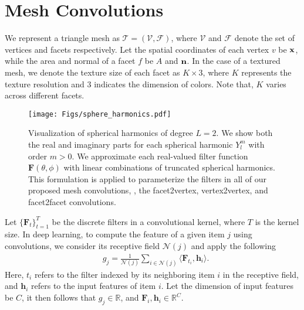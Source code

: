 {\color{black}
\section{Mesh Convolutions}
\vspace{2mm}
We represent a triangle mesh as $\mathcal{T}=(\mathcal{V},\mathcal{F})$, where $\mathcal{V}$ and $\mathcal{F}$ denote the set of vertices and facets respectively. 
Let the spatial coordinates of each vertex $v$ be ${\bf x}$, while the area and normal of a facet $f$ be $A$ and ${\bf n}$.
In the case of a textured mesh, we denote the texture size of each facet as $K \times 3$, where $K$ represents the texture resolution and 3 indicates the dimension of colors. Note that, $K$ varies across different facets.
\begin{figure*}[!t]
    \centering
\texttt{[image: Figs/sphere\_harmonics.pdf]}
    \vspace{-3mm}
    \caption{\color{black}Visualization of spherical harmonics of degree $L=2$. We show both the real and imaginary parts for each spherical harmonic $Y_l^m$ with order $m>0$. We approximate each real-valued filter function ${\mathbf F}(\theta,\phi)$ with linear combinations of truncated spherical harmonics. This formulation is applied to parameterize the filters in all of our proposed mesh
convolutions, \ie,  the facet2vertex, vertex2vertex, and
facet2facet convolutions.} 
    \label{fig:sphere_harmonics}
    \vspace{-2mm}
\end{figure*}

Let $\{\mathbf{F}_t\}_{t=1}^T$ be the discrete filters in a convolutional kernel, where $T$ is the kernel size. In deep learning, to compute the feature of a given item $j$ using convolutions, we consider its receptive field $\mathcal{N}(j)$ and apply the following 
\begin{align}
&g_j =\frac{1}{\mathcal{N}(j)}\sum_{i\in\mathcal{N}(j)}\langle\mathbf{F}_{t_i},\mathbf{h}_i\rangle.
\label{eq:basic_Conv}
\end{align}
Here, $t_i$ refers to the filter indexed by its neighboring item $i$ in the receptive field, and $\mathbf{h}_i$ refers to the input features of item $i$. Let the dimension of input features  be  $C$, it then follows that $g_j\in\mathbb{R}$, and ${\mathbf F}_i, {\mathbf h}_i\in\mathbb{R}^C$. 

}
